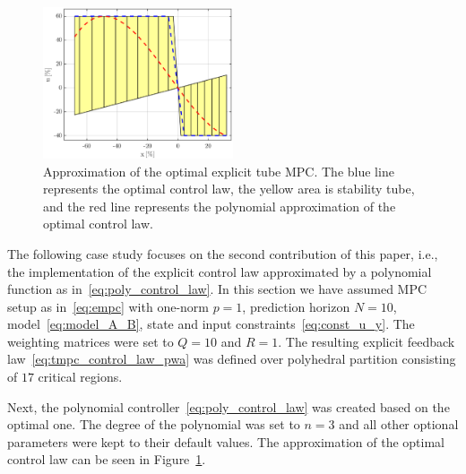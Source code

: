 \documentclass[letterpaper, 10 pt, conference]{ieeeconf}
\newcommand{\polydegree}{n}
\begin{document}
\begin{figure}[bp!]
	\begin{center}
		\includegraphics[width=0.5\textwidth]{images/approximation.eps}
		\caption{Approximation of the optimal explicit tube MPC. The blue line represents the optimal control law, the yellow area is stability tube, and the red line represents the polynomial approximation of the optimal control law.}
		\label{fig:approx}
	\end{center}
\end{figure}

The following case study focuses on the second contribution of this paper, i.e., the implementation of the explicit control law approximated by a polynomial function as in~\eqref{eq:poly_control_law}. 
%
In this section we have assumed MPC setup as in~\eqref{eq:empc} with one-norm $p = 1$, prediction horizon $N = 10$, model~\eqref{eq:model_A_B}, state and input constraints~\eqref{eq:const_u_y}. The weighting matrices were set to $Q = 10$ and $R = 1$.
%
The resulting explicit feedback law~\eqref{eq:tmpc_control_law_pwa} was defined over polyhedral partition consisting of $17$ critical regions.

Next, the polynomial controller~\eqref{eq:poly_control_law} was created based on the optimal one. The degree of the polynomial was set to $\polydegree = 3$ and all other optional parameters were kept to their default values. The approximation of the optimal control law can be seen in Figure~\ref{fig:approx}.




\end{document}
